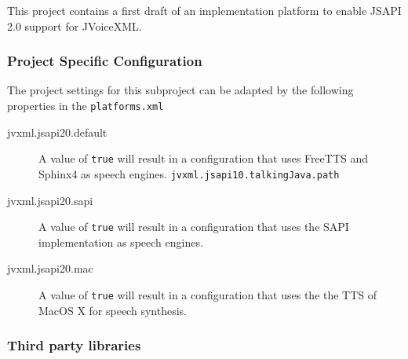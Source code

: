 \documentclass[11pt,a4paper]{article}
\begin{document}
This project contains a first draft of an implementation platform to enable
JSAPI 2.0 support for JVoiceXML.

\subsubsection{Project Specific Configuration}

The project settings for this subproject can be adapted by the following
properties in the \texttt{platforms.xml}

\begin{description}
\item[jvxml.jsapi20.default] A value of \texttt{true} will result in a
configuration that uses FreeTTS and Sphinx4 as speech engines.
\texttt{jvxml.jsapi10.talkingJava.path}
\item[jvxml.jsapi20.sapi]  A value of \texttt{true} will result in a
configuration that uses the SAPI implementation as speech engines.
\item[jvxml.jsapi20.mac]  A value of \texttt{true} will result in a
configuration that uses the the TTS of MacOS X for speech synthesis.
\end{description}

\subsubsection{Third party libraries}
\label{sec:jsapi20-third-party-libr}
\end{document}
